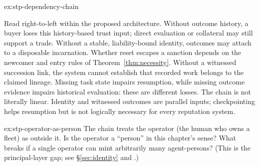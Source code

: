 \documentclass[11pt,a4paper]{article}
\theoremstyle{definition}
\begin{document}
\begin{pdsolution}{ex:stp-dependency-chain}
\par\smallskip
\begin{center}
%
\end{center}
\par\smallskip
Read right-to-left within the proposed architecture. Without outcome history,
a buyer loses this history-based trust input; direct evaluation or collateral
may still support a trade. Without a stable, liability-bound identity, outcomes
may attach to a disposable incarnation. Whether reset escapes a sanction depends
on the newcomer and entry rules of Theorem~\ref{thm:necessity}. Without a
witnessed succession link, the system cannot establish that recorded work belongs
to the claimed lineage. Missing task state impairs resumption, while missing
outcome evidence impairs historical evaluation: these are different losses.
The chain is not literally linear. Identity and witnessed outcomes are parallel
inputs; checkpointing helps resumption but is not logically necessary for every
reputation system.
\end{pdsolution}
\begin{pdexercise}[kind=Open,rating=3]{ex:stp-operator-as-person}
The chain treats the operator (the human who owns a fleet) as outside it. Is
the operator a ``person'' in this chapter's sense? What breaks if a single
operator can mint arbitrarily many agent-persons? (This is the principal-layer
gap; see \S\ref{sec:identity} and .)
\end{pdexercise}
\end{document}
